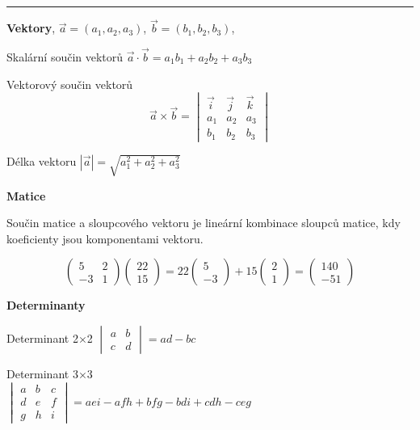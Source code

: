 \documentclass{article}
\begin{document}
\begin{multicols}{3}
\smallskip
\hrule


\textbf{Vektory}, $\vec a=(a_1,a_2,a_3)$, $\vec b=(b_1,b_2,b_3)$, 

Skalární součin vektorů
$\vec a\cdot\vec b=a_1 b_1 + a_2 b_2+a_3b_3$

Vektorový součin vektorů
\vspace*{-8pt}
$$\vec a\times \vec b=
\begin{vmatrix}
  \vec i & \vec j & \vec k\\
  a_1 & a_2 & a_3 \\
  b_1 & b_2 & b_3
\end{vmatrix}
$$

Délka vektoru  $|\vec a|=\sqrt{a_1^2+a_2^2+a_3^2}$

\textbf{Matice}

Součin matice a sloupcového vektoru je lineární kombinace sloupců matice, kdy koeficienty jsou komponentami vektoru.

$$
\begin{pmatrix}
  5& 2\\-3 & 1
\end{pmatrix}
\begin{pmatrix}
  22\\15
\end{pmatrix}
=
22
\begin{pmatrix}
  5\\-3
\end{pmatrix}
+
15
\begin{pmatrix}
  2\\1
\end{pmatrix}
=
\begin{pmatrix}
  140 \\-51
\end{pmatrix}
$$

\textbf{Determinanty}

\let\oldtextbf\textbf
\def\textbf{\smallskip\hrule\oldtextbf}
\vspace*{-10pt}

Determinant 2$\times$2 \hfill$
\begin{vmatrix}
  a & b \\ c &d
\end{vmatrix}
=ad-bc
$

Determinant 3$\times$3 \\\null\hfill$
\begin{vmatrix}
  a & b & c \\ d & e &f \\ g & h & i
\end{vmatrix}
=aei-afh+bfg-bdi+cdh-ceg
$\hfill\null


\end{multicols}
\end{document}
